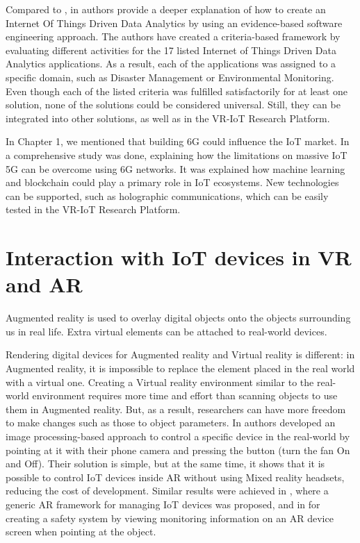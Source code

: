 Compared to \cite{k_mohapatra_solution_2016}, in \cite{ahmad_software_2021} authors provide a deeper explanation of how to create an Internet Of Things Driven Data Analytics by using an evidence-based software engineering approach. The authors have created a criteria-based framework by evaluating different activities for the 17 listed Internet of Things Driven Data Analytics applications. As a result, each of the applications was assigned to a specific domain, such as Disaster Management or Environmental Monitoring. Even though each of the listed criteria was fulfilled satisfactorily for at least one solution, none of the solutions could be considered universal. Still, they can be integrated into other solutions, as well as in the VR-IoT Research Platform.

In Chapter 1, we mentioned that building 6G could influence the IoT market. In \cite{guo_enabling_2021} a comprehensive study was done, explaining how the limitations on massive IoT 5G can be overcome using 6G networks. It was explained how machine learning and blockchain could play a primary role in IoT ecosystems. New technologies can be supported, such as holographic communications, which can be easily tested in the VR-IoT Research Platform.

\section{Interaction with IoT devices in VR and AR}

Augmented reality is used to overlay digital objects onto the objects surrounding us in real life. Extra virtual elements can be attached to real-world devices.

Rendering digital devices for Augmented reality and Virtual reality is different: in Augmented reality, it is impossible to replace the element placed in the real world with a virtual one. Creating a Virtual reality environment similar to the real-world environment requires more time and effort than scanning objects to use them in Augmented reality. But, as a result, researchers can have more freedom to make changes such as those to object parameters. 
In \cite{ankireddy_augmented_2019} authors developed an image processing-based approach to control a specific device in the real-world by pointing at it with their phone camera and pressing the button (turn the fan On and Off). Their solution is simple, but at the same time, it shows that it is possible to control IoT devices inside AR without using Mixed reality headsets, reducing the cost of development. Similar results were achieved in \cite{jo_-situ_2016}, where a generic AR framework for managing IoT devices was proposed, and in \cite{alam_augmented_2017} for creating a safety system by viewing monitoring information on an AR device screen when pointing at the object.

